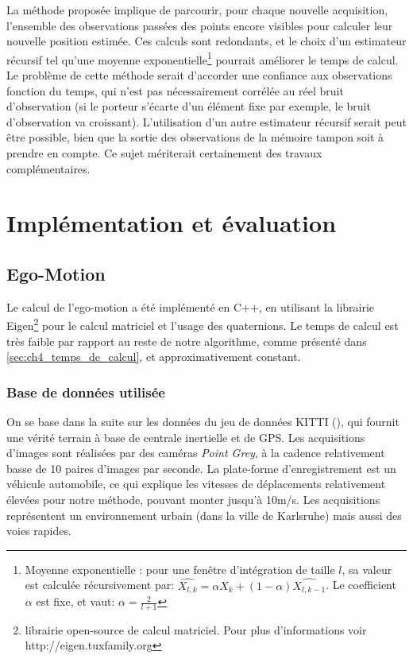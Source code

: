 La méthode proposée implique de parcourir, pour chaque nouvelle acquisition, l'ensemble des observations passées des points encore visibles pour calculer leur nouvelle position estimée. Ces calculs sont redondants, et le choix d'un estimateur récursif tel qu'une moyenne exponentielle\footnote{Moyenne exponentielle : pour une fenêtre d'intégration de taille $l$, sa valeur est calculée récursivement par: $\hat{X_{l,k}} = \alpha X_k + (1-\alpha) \hat{X_{l,k-1}}$. Le coefficient $\alpha$ est fixe, et vaut: $\alpha = \frac{2}{l + 1}$ } pourrait améliorer le temps de calcul. Le problème de cette méthode serait d'accorder une confiance aux observations fonction du temps, qui n'est pas nécessairement corrélée au réel bruit d'observation (si le porteur s'écarte d'un élément fixe par exemple, le bruit d'observation va croissant). L'utilisation d'un autre estimateur récursif serait peut être possible, bien que la sortie des observations de la mémoire tampon soit à prendre en compte. Ce sujet mériterait certainement des travaux complémentaires.

\section{Implémentation et évaluation} 
\subsection{Ego-Motion}\label{sec:ch4_eval_ego_motion}
Le calcul de l'ego-motion a été implémenté en C++, en utilisant la librairie Eigen\footnote{librairie open-source de calcul matriciel. Pour plus d'informations voir http://eigen.tuxfamily.org} pour le calcul matriciel et l'usage des quaternions. Le temps de calcul est très faible par rapport au reste de notre algorithme, comme présenté dans \ref{sec:ch4_temps_de_calcul}, et approximativement constant.

\subsubsection{Base de données utilisée}
On se base dans la suite sur les données du jeu de données KITTI (\cite{Geiger2012}), qui fournit une vérité terrain à base de centrale inertielle et de GPS. Les acquisitions d'images sont réalisées par des caméras \textit{Point Grey}, à la cadence relativement basse de 10 paires d'images par seconde. La plate-forme d'enregistrement est un véhicule automobile, ce qui explique les vitesses de déplacements relativement élevées pour notre méthode, pouvant monter jusqu'à 10m/s. Les acquisitions représentent un environnement urbain (dans la ville de Karlsruhe) mais aussi des voies rapides.


